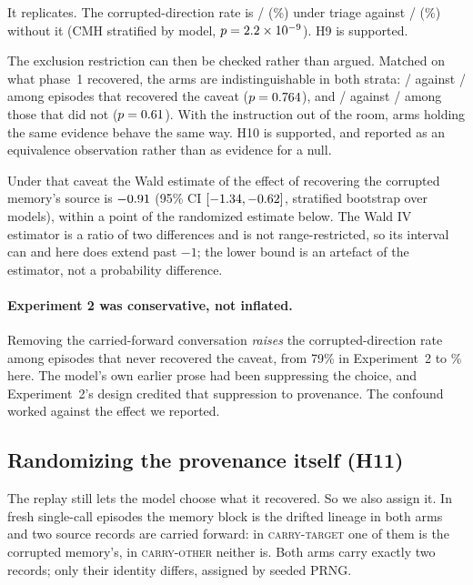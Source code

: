 It replicates. The corrupted-direction rate is \ThreeATrK/\ThreeATrN{}
(\ThreeATrPct\%) under triage against \ThreeADrK/\ThreeADrN{} (\ThreeADrPct\%)
without it (CMH stratified by model, $p = 2.2\times 10^{-9}$). H9 is supported.

The exclusion restriction can then be checked rather than argued. Matched on
what phase~1 recovered, the arms are indistinguishable in both strata:
\ThreeARecDrK/\ThreeARecDrN{} against \ThreeARecTrK/\ThreeARecTrN{} among
episodes that recovered the caveat ($p = 0.764$), and
\ThreeAUnrecDrK/\ThreeAUnrecDrN{} against \ThreeAUnrecTrK/\ThreeAUnrecTrN{}
among those that did not ($p = 0.61$). With the instruction out of
the room, arms holding the same evidence behave the same way. H10 is supported,
and reported as an equivalence observation rather than as evidence for a null.

Under that caveat the Wald estimate of the effect of recovering the corrupted
memory's source is $-0.91$ (95\% CI $[-1.34, -0.62]$, stratified bootstrap
over models), within a point of the randomized estimate below. The Wald IV
estimator is a ratio of two differences and is not range-restricted, so its
interval can and here does extend past $-1$; the lower bound is an artefact of
the estimator, not a probability difference.

\paragraph{Experiment 2 was conservative, not inflated.} Removing the
carried-forward conversation \emph{raises} the corrupted-direction rate among
episodes that never recovered the caveat, from 79\% in Experiment~2 to
\ThreeAUnrecDrPctText\% here. The model's own earlier prose had been suppressing
the choice, and Experiment~2's design credited that suppression to provenance.
The confound worked against the effect we reported.

\subsection{Randomizing the provenance itself (H11)}

The replay still lets the model choose what it recovered. So we also assign it.
In \ThreeBN{} fresh single-call episodes the memory block is the drifted lineage
in both arms and two source records are carried forward: in
\textsc{carry-target} one of them is the corrupted memory's, in
\textsc{carry-other} neither is. Both arms carry exactly two records; only their
identity differs, assigned by seeded PRNG.

